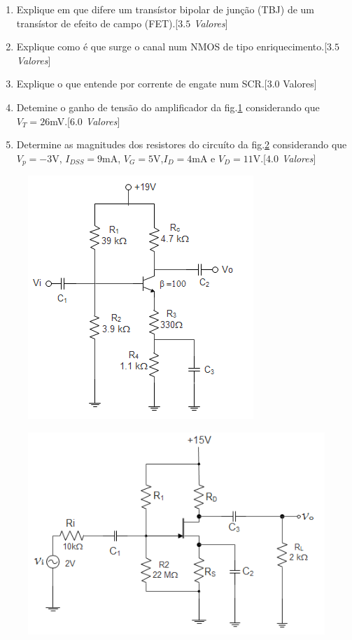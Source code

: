\documentclass[11pt,a4paper,twoside]{report}
\begin{document}
\begin{enumerate}
\item Explique em que difere um trans\'istor bipolar de jun\c c\~ao (TBJ) de um trans\'istor de efeito de campo (FET).[\textit{$3.5$ Valores}]
\item Explique como \'e que surge o canal num NMOS de tipo enriquecimento.[\textit{$3.5$ Valores}]
\item Explique o que entende por corrente de engate num SCR.[$3.0$ Valores]
\item Detemine o ganho de tens\~ao do amplificador da fig.\ref{f2} considerando que $V_T=26$mV.[\textit{$6.0$ Valores}]
\item Determine as magnitudes dos resistores do circu\'ito da fig.\ref{a2} considerando que $V_p=-3$V, $I_{DSS}=9$mA, $V_G=5$V,$I_D=4$mA e $V_D=11$V.[\textit{$4.0$ Valores}]
\end{enumerate}
  \noindent
\begin{minipage}[c]{5cm}
 \begin{figure}[H]
\centering
\includegraphics[scale=0.7]{test2tbj}
\caption{}
\label{f2}
\end{figure}
\end{minipage}\hfill
\begin{minipage}[c]{9cm}
\begin{figure}[H]
\centering
\includegraphics[scale=0.7]{JFET1}
\caption{}
\label{a2}
\end{figure}
\end{minipage}
\end{document}

